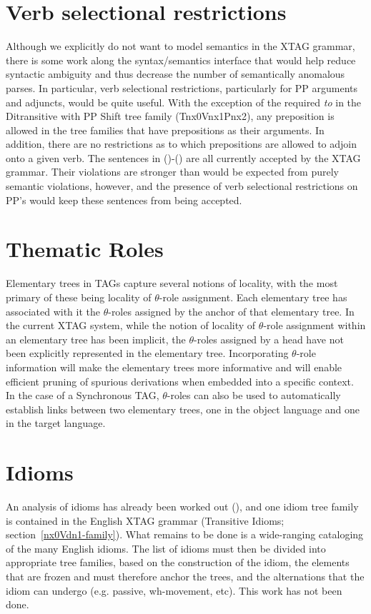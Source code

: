 \section{Verb selectional restrictions}

Although we explicitly do not want to model semantics in the XTAG grammar,
there is some work along the syntax/semantics interface that would help reduce
syntactic ambiguity and thus decrease the number of semantically anomalous
parses.  In particular, verb selectional restrictions, particularly for PP
arguments and adjuncts, would be quite useful.  With the exception of the
required {\it to} in the Ditransitive with PP Shift tree family (Tnx0Vnx1Pnx2),
any preposition is allowed in the tree families that have prepositions as their
arguments.  In addition, there are no restrictions as to which prepositions are
allowed to adjoin onto a given verb.  The sentences in ()-() are
all currently accepted by the XTAG grammar.  Their violations are stronger than
would be expected from purely semantic violations, however, and the presence of
verb selectional restrictions on PP's would keep these sentences from being
accepted.


\section{Thematic Roles}

Elementary trees in TAGs capture several notions of locality, with the most
primary of these being locality of $\theta$-role assignment.  Each elementary
tree has associated with it the $\theta$-roles assigned by the anchor of that
elementary tree.  In the current XTAG system, while the notion of locality of
$\theta$-role assignment within an elementary tree has been implicit, the
$\theta$-roles assigned by a head have not been explicitly represented in the
elementary tree. Incorporating $\theta$-role information will make the
elementary trees more informative and will enable efficient pruning of spurious
derivations when embedded into a specific context.  In the case of a
Synchronous TAG, $\theta$-roles can also be used to automatically establish
links between two elementary trees, one in the object language and one in the
target language.


\section{Idioms}

An analysis of idioms has already been worked out (\cite{AS89}), and one idiom
tree family is contained in the English XTAG grammar (Transitive Idioms;
section~\ref{nx0Vdn1-family}).  What remains to be done is a wide-ranging
cataloging of the many English idioms.  The list of idioms must then be divided
into appropriate tree families, based on the construction of the idiom, the
elements that are frozen and must therefore anchor the trees, and the
alternations that the idiom can undergo (e.g. passive, wh-movement, etc).  This
work has not been done.
